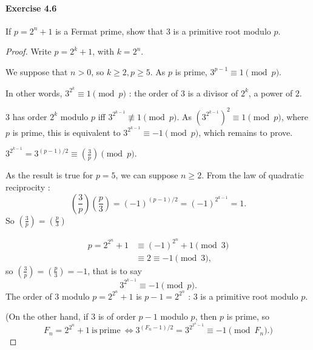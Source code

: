 \documentclass{article}
\begin{document}
\paragraph{Exercise 4.6} If $p=2^{n}+1$ is a Fermat prime, show that 3 is a primitive root modulo $p$.
\begin{proof}
 \newcommand{\legendre}[2]{\genfrac{(}{)}{}{}{#1}{#2}}
Write $p = 2^k + 1$, with $k = 2^n$.

We suppose that $n>0$, so $k\geq 2, p \geq 5$. As $p$ is prime, $3^{p-1} \equiv 1 \pmod p$. 

In other words, $3^{2^k} \equiv 1 \pmod p$ : the order of $3$ is a divisor of $2^k$, a power of $2$.

$3$ has order $2^k$ modulo $p$ iff $3^{2^{k-1}} \not \equiv 1 \pmod p$. As $\left (3^{2^{k-1}} \right)^2 \equiv 1 \pmod p$, where $p$ is prime, this is equivalent to $3^{2^{k-1}}  \equiv -1 \pmod p$, which remains to prove.

$3^{2^{k-1}} = 3^{(p-1)/2} \equiv \legendre{3}{p} \pmod p$.

As the result is true for $p=5$, we can suppose $n\geq 2$.
From the law of quadratic reciprocity :
$$\legendre{3}{p} \legendre{p}{3} = (-1)^{(p-1)/2} = (-1)^{2^{k-1}} = 1.$$
So $\legendre{3}{p} = \legendre{p}{3}$
 
\begin{align*}
p = 2^{2^n}+1 &\equiv (-1)^{2^n} + 1 \pmod 3\\
&\equiv 2 \equiv -1 \pmod 3,
\end{align*}
so $\legendre{3}{p} = \legendre {p}{3} = -1$, that is to say
$$3^{2^{k-1}}  \equiv -1 \pmod p.$$
The order of $3$ modulo $p = 2^{2^n} + 1$ is $p-1 = 2^{2^n}$ : $3$ is a primitive root modulo $p$.

(On the other hand, if $3$ is of order $p-1$ modulo $p$, then $p$ is prime, so
$$ F_n = 2^{2^n} + 1 \ \mathrm{is}\ \mathrm{prime}\ \iff 3^{(F_n-1)/2} = 3^{2^{2^n - 1}} \equiv -1 \pmod {F_n}.)$$
\end{proof}
\end{document}
